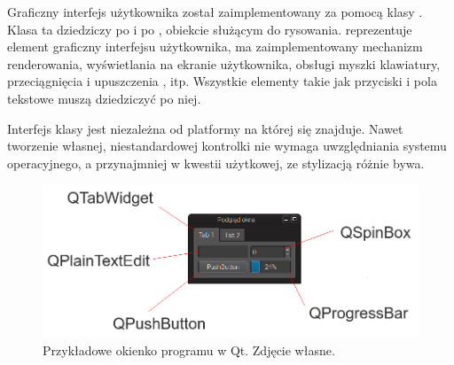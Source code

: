 \par
Graficzny interfejs użytkownika został zaimplementowany za pomocą klasy .
Klasa ta dziedziczy po  i po , obiekcie służącym do rysowania.
 reprezentuje element graficzny interfejsu użytkownika, ma zaimplementowany mechanizm renderowania, wyświetlania na ekranie użytkownika, obsługi myszki klawiatury, przeciągnięcia i upuszczenia , itp.
Wszystkie elementy takie jak przyciski i pola tekstowe muszą dziedziczyć po niej.
\par
Interfejs klasy jest niezależna od platformy na której się znajduje.
Nawet tworzenie własnej, niestandardowej kontrolki nie wymaga uwzględniania systemu operacyjnego, a przynajmniej w kwestii użytkowej, ze stylizacją różnie bywa.

\begin{figure}[!htbp]
    \centering
    \includegraphics[width=\textwidth]{img/qt-gui-001.png}
    \caption{Przykładowe okienko programu w Qt. Zdjęcie własne.}
    \label{fig:qtgui1}
\end{figure}

